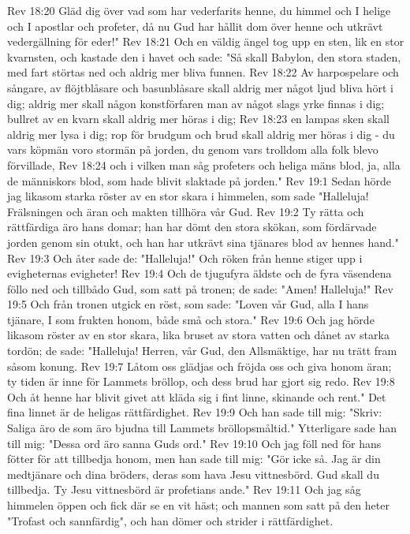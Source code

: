 Rev 18:20  Gläd dig över vad som har vederfarits henne, du himmel och I helige och I apostlar och profeter, då nu Gud har hållit dom över henne och utkrävt vedergällning för eder!"
Rev 18:21  Och en väldig ängel tog upp en sten, lik en stor kvarnsten, och kastade den i havet och sade: "Så skall Babylon, den stora staden, med fart störtas ned och aldrig mer bliva funnen.
Rev 18:22  Av harpospelare och sångare, av flöjtblåsare och basunblåsare skall aldrig mer något ljud bliva hört i dig; aldrig mer skall någon konstförfaren man av något slags yrke finnas i dig; bullret av en kvarn skall aldrig mer höras i dig;
Rev 18:23  en lampas sken skall aldrig mer lysa i dig; rop för brudgum och brud skall aldrig mer höras i dig - du vars köpmän voro stormän på jorden, du genom vars trolldom alla folk blevo förvillade,
Rev 18:24  och i vilken man såg profeters och heliga mäns blod, ja, alla de människors blod, som hade blivit slaktade på jorden."
Rev 19:1  Sedan hörde jag likasom starka röster av en stor skara i himmelen, som sade "Halleluja! Frälsningen och äran och makten tillhöra vår Gud.
Rev 19:2  Ty rätta och rättfärdiga äro hans domar; han har dömt den stora skökan, som fördärvade jorden genom sin otukt, och han har utkrävt sina tjänares blod av hennes hand."
Rev 19:3  Och åter sade de: "Halleluja!" Och röken från henne stiger upp i evigheternas evigheter!
Rev 19:4  Och de tjugufyra äldste och de fyra väsendena föllo ned och tillbådo Gud, som satt på tronen; de sade: "Amen! Halleluja!"
Rev 19:5  Och från tronen utgick en röst, som sade: "Loven vår Gud, alla I hans tjänare, I som frukten honom, både små och stora."
Rev 19:6  Och jag hörde likasom röster av en stor skara, lika bruset av stora vatten och dånet av starka tordön; de sade: "Halleluja! Herren, vår Gud, den Allsmäktige, har nu trätt fram såsom konung.
Rev 19:7  Låtom oss glädjas och fröjda oss och giva honom äran; ty tiden är inne för Lammets bröllop, och dess brud har gjort sig redo.
Rev 19:8  Och åt henne har blivit givet att kläda sig i fint linne, skinande och rent." Det fina linnet är de heligas rättfärdighet.
Rev 19:9  Och han sade till mig: "Skriv: Saliga äro de som äro bjudna till Lammets bröllopsmåltid." Ytterligare sade han till mig: "Dessa ord äro sanna Guds ord."
Rev 19:10  Och jag föll ned för hans fötter för att tillbedja honom, men han sade till mig: "Gör icke så. Jag är din medtjänare och dina bröders, deras som hava Jesu vittnesbörd. Gud skall du tillbedja. Ty Jesu vittnesbörd är profetians ande."
Rev 19:11  Och jag såg himmelen öppen och fick där se en vit häst; och mannen som satt på den heter "Trofast och sannfärdig", och han dömer och strider i rättfärdighet.

